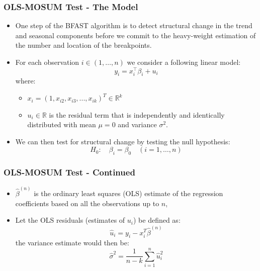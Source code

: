 \documentclass[9pt]{beamer}
\begin{document}
\begin{frame}
\frametitle{OLS-MOSUM Test - The Model}
\begin{itemize}
  \item One step of the BFAST algorithm is to detect structural change in the
    trend and seasonal components before we commit to the heavy-weight
    estimation of the number and location of the breakpoints.
  \item For each observation $i \in (1, \ldots, n)$ we consider a following linear model:
    \[
    y_{i}=x_{i}^{\top} \beta_{i}+u_{i}
    \]
    where:
    \begin{itemize}
    \item $x_i = (1,x_{i2}, x_{i3}, ..., x_{ik})^T \in \mathbb{R}^k$
    \item $u_i \in \mathbb{R}$ is the residual term that is independently and identically
      distributed with mean $\mu = 0$ and variance $\sigma^2$.
    \end{itemize}
  \item 
    We can then test for structural change by testing the null hypothesis:
    \[
    H_0:\quad \beta_i = \beta_0 \quad(i=1, \ldots, n)
    \]
\end{itemize}
\end{frame}

\begin{frame}
  \frametitle{OLS-MOSUM Test - Continued}
  \begin{itemize}
  \item $\hat{\beta}^{(n)}$ is the ordinary least squares (OLS) estimate of the
    regression coefficients based on all the observations up to $n$,
  \item 
    Let the OLS residuals (estimates of $u_i$) be defined as:
    \begin{equation} \label{eq:residuals}
      \hat{u}_i = y_i - x_i^T\hat{\beta}^{(n)}
    \end{equation}
    the variance estimate would then be:
    \begin{equation} \label{eq:sigma}
      \hat{\sigma}^{2}=\frac{1}{n-k} \sum_{i=1}^{n} \hat{u}_{i}^{2}
    \end{equation}
  \end{itemize} 
\end{frame}
\end{document}
